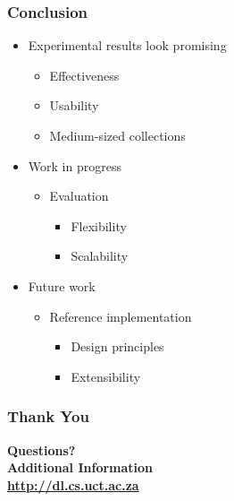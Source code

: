 \documentclass[xcolor=dvitex,t,11pt]{beamer}
\begin{document}
\begin{frame}[fragile]
\frametitle{Conclusion}

\begin{itemize}
\item<1-> Experimental results look promising
\begin{itemize}
\item<2-> Effectiveness
\item<3-> Usability
\item<4-> Medium-sized collections
\end{itemize}

\item<5-> Work in progress
\begin{itemize}
\item<6-> Evaluation
\begin{itemize}
\item<7-> Flexibility
\item<8-> Scalability
\end{itemize}
\end{itemize}

\item<9-> Future work
\begin{itemize}
\item<10-> Reference implementation
\begin{itemize} 
\item<11-> Design principles
\item<12-> Extensibility
\end{itemize}
\end{itemize}

\end{itemize}

\end{frame}

\begin{frame}[fragile]
\frametitle{Thank You}
\begin{center}
\bigskip
\textbf{\fontsize{18}{18}\selectfont Questions?} \\
\textbf{\fontsize{18}{18}\selectfont Additional Information} \\
\bigskip
\textbf{\fontsize{18}{18}\selectfont \url{http://dl.cs.uct.ac.za}}
\end{center}
\end{frame}
\end{document}
